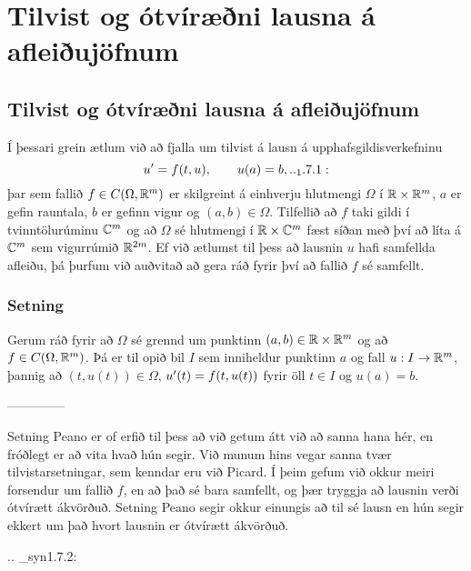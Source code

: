 \section{Tilvist og ótvíræðni lausna á afleiðujöfnum}

\subsection{Tilvist og ótvíræðni lausna á afleiðujöfnum}

\noindent
Í þessari grein ætlum við að fjalla um
tilvist á lausn á upphafsgildisverkefninu
 \begin{equation*}u\dash=f(t,u),  \qquad u(a)=b,

.. _1.7.1:

 \end{equation*}
þar sem fallið $f\in C(\Omega,{\mathbb R}^m)$ er skilgreint á einhverju
hlutmengi $\Omega$ í 
${\mathbb R}\times {\mathbb R}^m$, $a$ er gefin rauntala, $b$ er gefinn vigur og
$(a,b)\in \Omega$.  Tilfellið að $f$ taki gildi í tvinntölurúminu
${\mathbb C}^m$ og  að $\Omega$ sé hlutmengi í  ${\mathbb R}\times {\mathbb C}^m$ fæst síðan með
því að líta á ${\mathbb C}^m$ sem vigurrúmið ${\mathbb R}^{2m}$.  Ef við ætlumst til þess að
lausnin $u$ hafi samfellda afleiðu, þá þurfum við auðvitað að gera
ráð fyrir því að fallið $f$ sé samfellt.

\subsubsection{Setning}  
Gerum ráð fyrir að $\Omega$ sé grennd um punktinn $(a,b)\in
{\mathbb R}\times{\mathbb R}^m$ og að $f\in C(\Omega,{\mathbb R}^m)$.  Þá
er til opið bil $I$ sem inniheldur punktinn $a$ og fall $u:I\to {\mathbb R}^m$,
þannig að $(t,u(t))\in \Omega$,  
$u{\sp{\prime}}(t)=f(t,u(t))$ fyrir öll $t\in I$ og $u(a)=b$. 


--------------





Setning Peano er of erfið til þess að við getum átt við að sanna hana
hér, en fróðlegt er að vita hvað hún segir. Við munum hins vegar
sanna tvær tilvistarsetningar, sem kenndar eru við Picard.  Í þeim
gefum við okkur meiri forsendur um fallið $f$, en að það sé bara
samfellt, og þær tryggja að lausnin
verði ótvírætt ákvörðuð.  Setning Peano segir okkur
einungis að til sé lausn en hún segir ekkert um það hvort lausnin er
ótvírætt ákvörðuð.  



.. _syn1.7.2:


